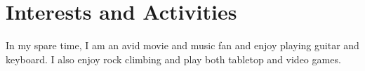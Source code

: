 \section{Interests and Activities}\label{sec:interests-and-activities}
In my spare time, I am an avid movie and music fan and enjoy playing guitar and keyboard.
I also enjoy rock climbing and play both tabletop and video games.